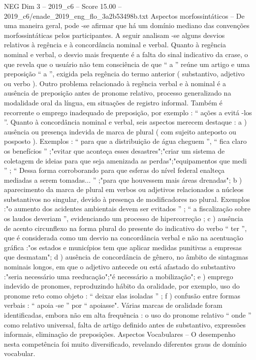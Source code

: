 \begin{textsample}{NEG Dim 3 – 2019\_c6 – Score 15.00 – 2019\_c6/enade\_2019\_eng\_flo\_3a2b53498b.txt}
Aspectos morfossintáticos – De uma maneira geral, pode -se afirmar que há um domínio mediano das convenções morfossintáticas pelos participantes.
A seguir analisam -se alguns desvios relativos à regência e à concordância nominal e verbal.
Quanto à regência nominal e verbal, o desvio mais frequente é a falta do sinal indicativo da crase, o que revela que o usuário não tem consciência de que “ a ” reúne um artigo e uma preposição “ a ”, exigida pela regência do termo anterior ( substantivo, adjetivo ou verbo ).
Outro problema relacionado à regência verbal e à nominal é a ausência de preposição antes de pronome relativo, processo generalizado na modalidade oral da língua, em situações de registro informal.
Também é recorrente o emprego inadequado de preposição, por exemplo : “ ações a evitá -los ”.
Quanto à concordância nominal e verbal, seis aspectos merecem destaque : a ) ausência ou presença indevida de marca de plural ( com sujeito anteposto ou posposto ).
Exemplos : “ para que a distribuição de água cheguem ”, “ fica claro os benefícios ” ;"evitar que aconteça esses desastres";"criar um sistema de coletagem de ideias para que seja amenizada as perdas";"equipamentos que medi ” ; “ Dessa forma corroborando para que esferas do nível federal enalteça mediadas a serem tomadas... ” ;"para que houvessem mais áreas drenadas"; b ) aparecimento da marca de plural em verbos ou adjetivos relacionados a núcleos substantivos no singular, devido à presença de modificadores no plural.
Exemplos :"o aumento dos acidentes ambientais devem ser evitados ” ; “ a fiscalização sobre os laudos deveriam ”, evidenciando um processo de hipercorreção ; c ) ausência de acento circunflexo na forma plural do presente do indicativo do verbo “ ter ”, que é considerada como um desvio na concordância verbal e não na acentuação gráfica :"os estados e municípios tem que aplicar medidas punitivas a empresas que desmatam"; d ) ausência de concordância de gênero, no âmbito de sintagmas nominais longos, em que o adjetivo antecede ou está afastado do substantivo :"seria necessário uma reeducação";"é necessário a mobilização"; e ) emprego indevido de pronomes, reproduzindo hábito da oralidade, por exemplo, uso do pronome reto como objeto : “ deixar elas isoladas ” ; f ) confusão entre formas verbais : “ apoia -se ” por “ apoiasse".
Várias marcas de oralidade foram identificadas, embora não em alta frequência : o uso do pronome relativo “ onde ” como relativo universal, falta de artigo definido antes de substantivo, expressões informais, eliminação de preposições.
Aspectos Vocabulares – O desempenho nesta competência foi muito diversificado, revelando diferentes graus de domínio vocabular.

\end{textsample}
